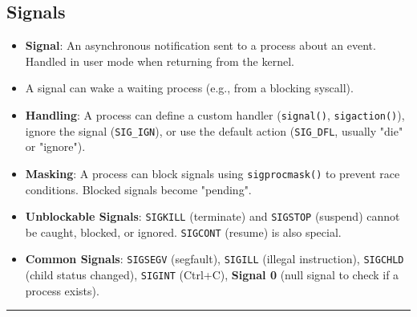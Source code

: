 \documentclass[8pt,a4paper]{article}
\newcommand{\sectiondivider}{\vspace{4pt}\hrule\vspace{4pt}}
\begin{document}
\begin{multicols}{2}
\subsection*{Signals}
\begin{itemize}
    \item \textbf{Signal}: An asynchronous notification sent to a process about an event. Handled in user mode when returning from the kernel.
    \item A signal can wake a waiting process (e.g., from a blocking syscall).
    \item \textbf{Handling}: A process can define a custom handler (\texttt{signal()}, \texttt{sigaction()}), ignore the signal (\texttt{SIG\_IGN}), or use the default action (\texttt{SIG\_DFL}, usually "die" or "ignore").
    \item \textbf{Masking}: A process can block signals using \texttt{sigprocmask()} to prevent race conditions. Blocked signals become "pending".
    \item \textbf{Unblockable Signals}: \texttt{SIGKILL} (terminate) and \texttt{SIGSTOP} (suspend) cannot be caught, blocked, or ignored. \texttt{SIGCONT} (resume) is also special.
    \item \textbf{Common Signals}: \texttt{SIGSEGV} (segfault), \texttt{SIGILL} (illegal instruction), \texttt{SIGCHLD} (child status changed), \texttt{SIGINT} (Ctrl+C), \textbf{Signal 0} (null signal to check if a process exists).
\end{itemize}

\sectiondivider

\end{multicols}
\end{document}
